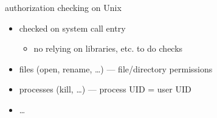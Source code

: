 \begin{frame}{authorization checking on Unix}
    \begin{itemize}
    \item checked on system call entry
        \begin{itemize}
        \item no relying on libraries, etc. to do checks
        \end{itemize}
    \vspace{.5cm}
    \item files (open, rename, \ldots) --- file/directory permissions
    \item processes (kill, \ldots) --- process UID = user UID
    \item \ldots
    \end{itemize}
\end{frame}
